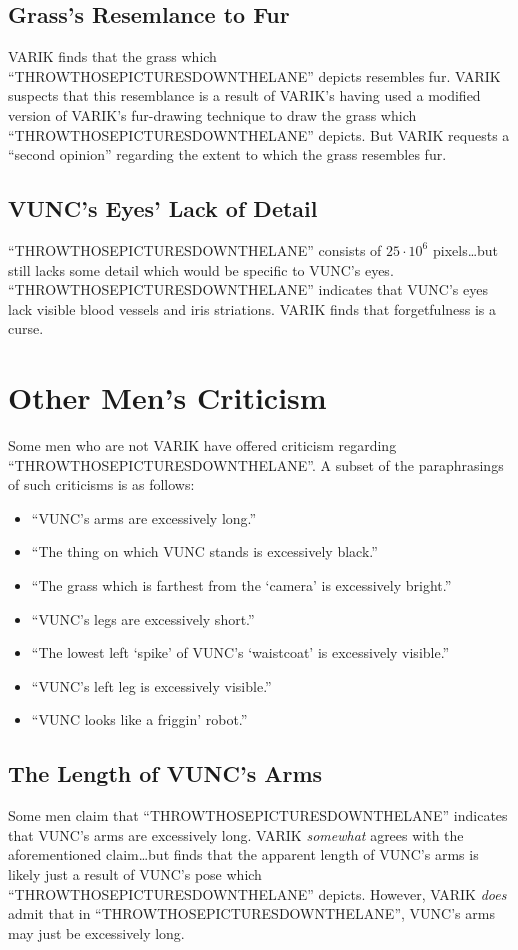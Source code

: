 \documentclass{report}
\begin{document}
\subsection{Grass's Resemlance to Fur}
VARIK finds that the grass which ``THROWTHOSEPICTURESDOWNTHELANE'' depicts resembles fur.  VARIK suspects that this resemblance is a result of VARIK's having used a modified version of VARIK's fur-drawing technique to draw the grass which ``THROWTHOSEPICTURESDOWNTHELANE'' depicts.  But VARIK requests a ``second opinion'' regarding the extent to which the grass resembles fur.

\subsection{VUNC's Eyes' Lack of Detail}
``THROWTHOSEPICTURESDOWNTHELANE'' consists of $25 \cdot 10^6$ pixels\ldots but still lacks some detail which would be specific to VUNC's eyes.  ``THROWTHOSEPICTURESDOWNTHELANE'' indicates that VUNC's eyes lack visible blood vessels and iris striations.  VARIK finds that forgetfulness is a curse.

\section{Other Men's Criticism}
Some men who are not VARIK have offered criticism regarding ``THROWTHOSEPICTURESDOWNTHELANE''.  A subset of the paraphrasings of such criticisms is as follows:

\begin{itemize}
	\item ``VUNC's arms are excessively long.''
	\item ``The thing on which VUNC stands is excessively black.''
	\item ``The grass which is farthest from the `camera' is excessively bright.''
	\item ``VUNC's legs are excessively short.''
	\item ``The lowest left `spike' of VUNC's `waistcoat' is excessively visible.''
	\item ``VUNC's left leg is excessively visible.''
	\item ``VUNC looks like a friggin' robot.''
\end{itemize}

\subsection{The Length of VUNC's Arms}
Some men claim that ``THROWTHOSEPICTURESDOWNTHELANE'' indicates that VUNC's arms are excessively long.  VARIK \textit{somewhat} agrees with the aforementioned claim\ldots but finds that the apparent length of VUNC's arms is likely just a result of VUNC's pose which ``THROWTHOSEPICTURESDOWNTHELANE'' depicts.  However, VARIK \textit{does} admit that in ``THROWTHOSEPICTURESDOWNTHELANE'', VUNC's arms may just be excessively long.
\end{document}

